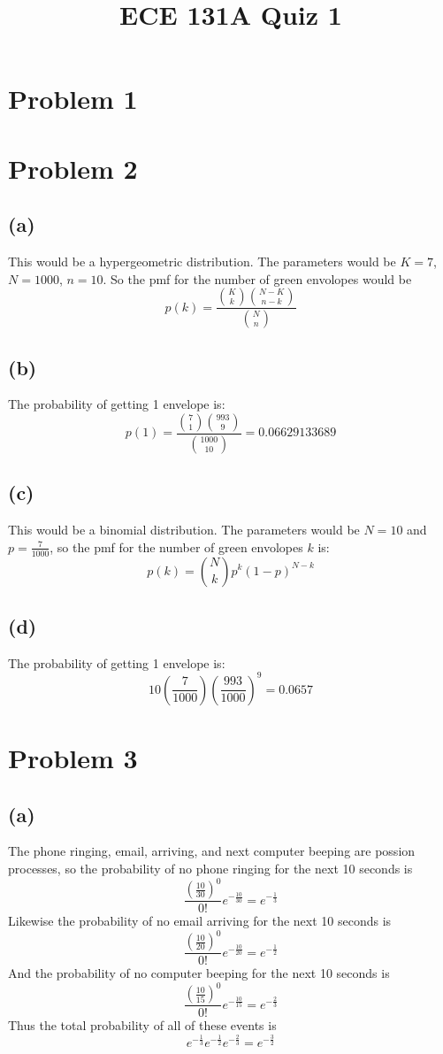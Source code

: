 
\title{ECE 131A Quiz 1}

\maketitle
\section*{Problem 1}
\section*{Problem 2}
\subsection*{(a)}
This would be a hypergeometric distribution. The parameters would be
$K=7$, $N=1000$, $n=10$. So the pmf for the number of green envolopes
would be
$$p(k)=\frac{\binom{K}{k}\binom{N-K}{n-k}}{\binom{N}{n}}$$
\subsection*{(b)}
The probability of getting 1 envelope is:
$$p(1)=\frac{\binom{7}{1}\binom{993}{9}}{\binom{1000}{10}}=0.06629133689$$
\subsection*{(c)}
This would be a binomial distribution. The parameters would be
$N=10$ and $p=\frac{7}{1000}$, so the pmf for the number of green envolopes $k$ 
is:
$$p(k)=\binom{N}{k}p^k(1-p)^{N-k}$$
\subsection*{(d)}
The probability of getting 1 envelope is:
$$10\left(\frac{7}{1000}\right)\left(\frac{993}{1000}\right)^9=\boxed{0.0657}$$
\section*{Problem 3}
\subsection*{(a)}
The phone ringing, email, arriving, and next computer beeping are 
possion processes, so the probability of no phone ringing for the next 10 seconds
is 
$$\frac{(\frac{10}{30})^0}{0!}e^{-\frac{10}{30}} = e^{-\frac{1}{3}}$$
Likewise the probability of no email arriving for the next 10 seconds is
$$\frac{(\frac{10}{20})^0}{0!}e^{-\frac{10}{20}} = e^{-\frac{1}{2}}$$
And the probability of no computer beeping for the next 10 seconds is
$$\frac{(\frac{10}{15})^0}{0!}e^{-\frac{10}{15}} = e^{-\frac{2}{3}}$$
Thus the total probability of all of these events is 
$$e^{-\frac{1}{3}}e^{-\frac{1}{2}}e^{-\frac{2}{3}} = \boxed{e^{-\frac{3}{2}}}$$
